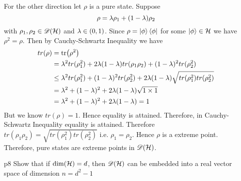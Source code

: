 \documentclass[a4paper, 11pt]{article}
\begin{document}
{\begin{itemize}
For the other direction let $\rho$ is a pure state. Suppose $$\rho=\lambda\rho_1+(1-\lambda)\rho_2$$ with $\rho_1,\rho_2\in{\mathscr{D}}(\mathcal{H})$ and $\lambda\in (0,1)$. Since $\rho=\ket{\phi}\bra{\phi}$ for some $\ket{\phi}\in \mathcal{H}$ we have $\rho^2=\rho$. Then  by Cauchy-Schwartz Inequality we have \begin{align*}
	tr(\rho) & =\tr(\rho^2)                                                                       \\
	         & = \lambda^2tr(\rho_1^2)+2\lambda(1-\lambda)tr(\rho_1\rho_2)+(1-\lambda)^2tr(\rho_2^2)              \\
	         & \leq\lambda^2tr(\rho_1^2)+(1-\lambda)^2tr(\rho_2^2)+2\lambda(1-\lambda)\sqrt{tr(\rho_1^2)tr(\rho_2^2)} \\
	         & =\lambda^2+(1-\lambda)^2+2\lambda(1-\lambda)\sqrt{1\times 1}        \\
	         & = \lambda^2+(1-\lambda)^2+2\lambda(1-\lambda)=1
\end{align*}
But we know $tr(\rho)=1$. Hence equality is attained. Therefore, in Cauchy-Schwartz Inequality equality is attained. Therefore $tr(\rho_1\rho_2)=\sqrt{tr(\rho_1^2)tr(\rho_2^2)}$ i.e. $\rho_1=\rho_2$. Hence $\rho$ is a extreme point. Therefore, pure states are extreme points in ${\mathscr{D}}(\mathcal{H})$. 
\end{itemize}
}


\begin{problem}{%
	}{p8%
	}
Show that if $\dim(\mathcal{H})=d$, then ${\mathscr{D}}(\mathcal{H})$ can be embedded  into a real vector space  of dimension $n=d^2-1$
\end{problem}
\end{document}
